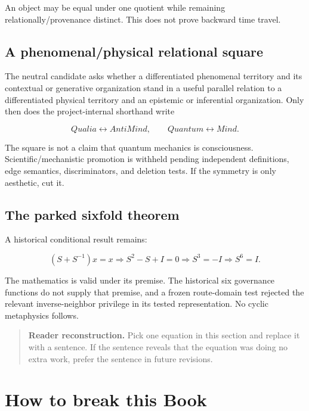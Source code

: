 \documentclass[11pt]{article}
\newenvironment{readercheck}{\begin{quote}\small\noindent\textbf{Reader reconstruction.}\;}{\end{quote}}
\begin{document}
An object may be equal under one quotient while remaining relationally/provenance distinct. This does not prove backward time travel.

\subsection{A phenomenal/physical relational square}

The neutral candidate asks whether a differentiated phenomenal territory and its contextual or generative organization stand in a useful parallel relation to a differentiated physical territory and an epistemic or inferential organization. Only then does the project-internal shorthand write

\begin{equation}
Qualia\leftrightarrow AntiMind,\qquad Quantum\leftrightarrow Mind.
\end{equation}

The square is not a claim that quantum mechanics is consciousness. Scientific/mechanistic promotion is withheld pending independent definitions, edge semantics, discriminators, and deletion tests. If the symmetry is only aesthetic, cut it.

\subsection{The parked sixfold theorem}

A historical conditional result remains:

\begin{equation}
(S+S^{-1})x=x\Rightarrow S^2-S+I=0\Rightarrow S^3=-I\Rightarrow S^6=I.
\end{equation}

The mathematics is valid under its premise. The historical six governance functions do not supply that premise, and a frozen route-domain test rejected the relevant inverse-neighbor privilege in its tested representation. No cyclic metaphysics follows.

\begin{readercheck}
Pick one equation in this section and replace it with a sentence. If the sentence reveals that the equation was doing no extra work, prefer the sentence in future revisions.
\end{readercheck}

\section{How to break this Book}
\end{document}
